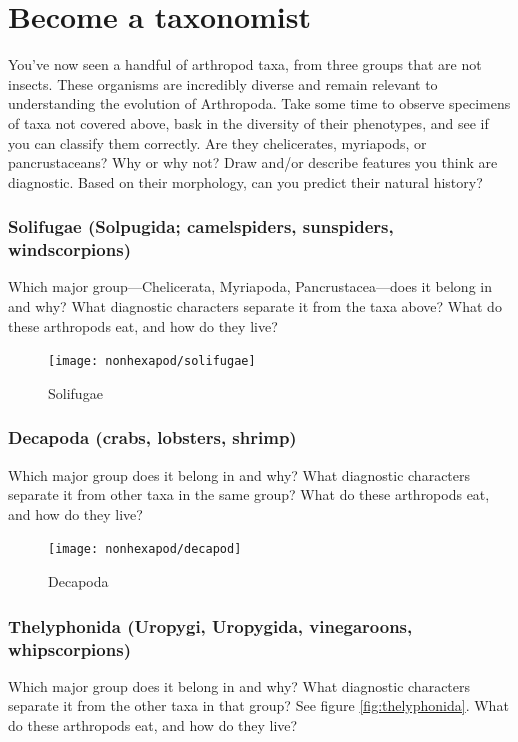\section*{Become a taxonomist}%

You've now seen a handful of arthropod taxa, from three groups that are not insects. These organisms are incredibly diverse and remain relevant to understanding the evolution of Arthropoda. Take some time to observe specimens of taxa not covered above, bask in the diversity of their phenotypes, and see if you can classify them correctly. Are they chelicerates, myriapods, or pancrustaceans? Why or why not? Draw and/or describe features you think are diagnostic. Based on their morphology, can you predict their natural history?

\subsubsection*{Solifugae (Solpugida; camelspiders, sunspiders, windscorpions)}
Which major group---Chelicerata, Myriapoda, Pancrustacea---does it belong in and why? What diagnostic characters separate it from the taxa above? What do these arthropods eat, and how do they live?\vspace{3mm}

\begin{figure}[ht!]
  \centering
    \texttt{[image: nonhexapod/solifugae]}
  \caption{Solifugae \citep[modified from][Plate 26, Fig. 2]{Bernard1894solifugae}}
  \label{fig:solfugida}
\end{figure}

\subsubsection*{Decapoda (crabs, lobsters, shrimp)}
Which major group does it belong in and why? What diagnostic characters separate it from other taxa in the same group? What do these arthropods eat, and how do they live?\vspace{3mm}

\begin{figure}[ht!]
  \centering
    \texttt{[image: nonhexapod/decapod]}
  \caption{Decapoda \citep[][Plate VII]{bhlitem114131}}
  \label{fig:decapoda}
\end{figure}

\subsubsection*{Thelyphonida (Uropygi, Uropygida, vinegaroons, whipscorpions)}
Which major group does it belong in and why? What diagnostic characters separate it from the other taxa in that group? See figure \ref{fig:thelyphonida}. What do these arthropods eat, and how do they live?\vspace{3mm}

